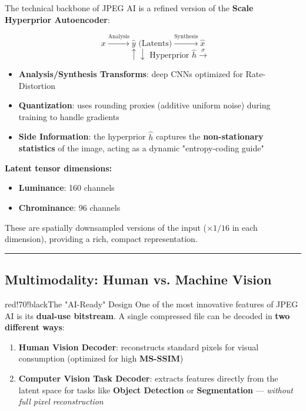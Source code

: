 The technical backbone of JPEG AI is a refined version of the \textbf{Scale Hyperprior Autoencoder}:

\[
x \xrightarrow{\text{Analysis}} \hat{y} \text{ (Latents)} \xrightarrow{\text{Synthesis}} \hat{x}
\]
\[
\quad\quad\quad\quad \uparrow\downarrow \text{ Hyperprior } \hat{h} \xrightarrow{\sigma}
\]

\begin{itemize}
\item \textbf{Analysis/Synthesis Transforms}: deep CNNs optimized for Rate-Distortion
\item \textbf{Quantization}: uses rounding proxies (additive uniform noise) during training to handle gradients
\item \textbf{Side Information}: the hyperprior $\hat{h}$ captures the \textbf{non-stationary statistics} of the image, acting as a dynamic "entropy-coding guide"
\end{itemize}

\textbf{Latent tensor dimensions:}
\begin{itemize}
\item \textbf{Luminance}: 160 channels
\item \textbf{Chrominance}: 96 channels
\end{itemize}

These are spatially downsampled versions of the input ($\times 1/16$ in each dimension), providing a rich, compact representation.

\bigskip\hrule\bigskip

\subsection{Multimodality: Human vs. Machine Vision}

\begin{calloutbox}{red!70!black}{The "AI-Ready" Design}
One of the most innovative features of JPEG AI is its \textbf{dual-use bitstream}. A single compressed file can be decoded in \textbf{two different ways}:

\begin{enumerate}
\item \textbf{Human Vision Decoder}: reconstructs standard pixels for visual consumption (optimized for high \textbf{MS-SSIM})
\item \textbf{Computer Vision Task Decoder}: extracts features directly from the latent space for tasks like \textbf{Object Detection} or \textbf{Segmentation} — \textit{without full pixel reconstruction}
\end{enumerate}
\end{calloutbox}

